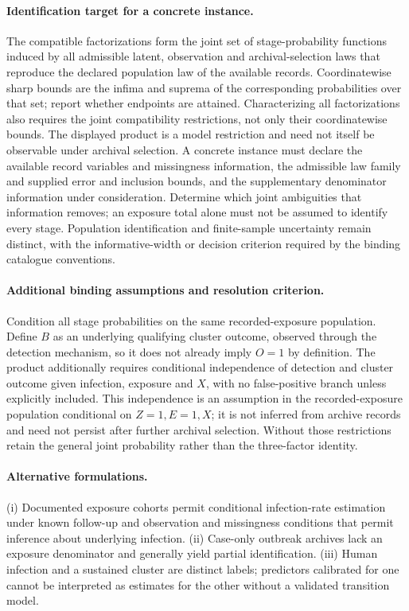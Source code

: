 \documentclass[11pt]{article}
\begin{document}
\paragraph{Identification target for a concrete instance.} The compatible factorizations form the joint set of stage-probability functions induced by all admissible latent, observation and archival-selection laws that reproduce the declared population law of the available records. Coordinatewise sharp bounds are the infima and suprema of the corresponding probabilities over that set; report whether endpoints are attained. Characterizing all factorizations also requires the joint compatibility restrictions, not only their coordinatewise bounds. The displayed product is a model restriction and need not itself be observable under archival selection. A concrete instance must declare the available record variables and missingness information, the admissible law family and supplied error and inclusion bounds, and the supplementary denominator information under consideration. Determine which joint ambiguities that information removes; an exposure total alone must not be assumed to identify every stage. Population identification and finite-sample uncertainty remain distinct, with the informative-width or decision criterion required by the binding catalogue conventions.
\paragraph{Additional binding assumptions and resolution criterion.} Condition all stage probabilities on the same recorded-exposure population. Define $B$ as an underlying qualifying cluster outcome, observed through the detection mechanism, so it does not already imply $O=1$ by definition. The product additionally requires conditional independence of detection and cluster outcome given infection, exposure and $X$, with no false-positive branch unless explicitly included. This independence is an assumption in the recorded-exposure population conditional on $Z=1,E=1,X$; it is not inferred from archive records and need not persist after further archival selection. Without those restrictions retain the general joint probability rather than the three-factor identity.

\paragraph{Alternative formulations.} (i) Documented exposure cohorts permit conditional infection-rate estimation under known follow-up and observation and missingness conditions that permit inference about underlying infection. (ii) Case-only outbreak archives lack an exposure denominator and generally yield partial identification. (iii) Human infection and a sustained cluster are distinct labels; predictors calibrated for one cannot be interpreted as estimates for the other without a validated transition model.
\end{document}
